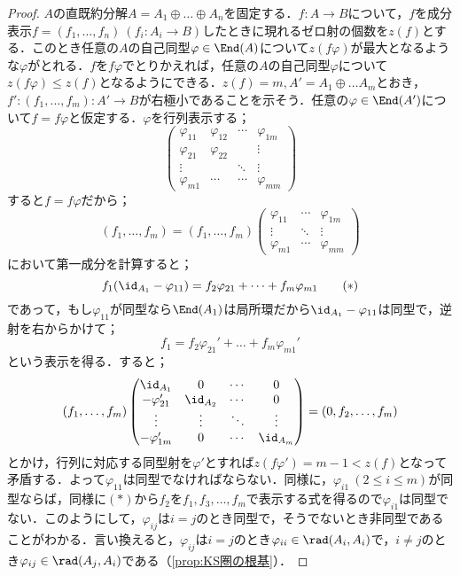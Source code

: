 \begin{proof}
	$A$の直既約分解$A=A_1\oplus\dots\oplus A_n$を固定する．$f:A\to B$について，$f$を成分表示$f=(f_1,\dots,f_n)~(f_i:A_i\to B)$したときに現れるゼロ射の個数を$z(f)$とする．このとき任意の$A$の自己同型$\varphi\in\End(A)$について$z(f\varphi)$が最大となるような$\varphi$がとれる．$f$を$f\varphi$でとりかえれば，任意の$A$の自己同型$\varphi$について$z(f\varphi)\leq z(f)$となるようにできる．$z(f)=m,A'=A_1\oplus\dots A_m$とおき，$f':(f_1,\dots,f_m):A'\to B$が右極小であることを示そう．任意の$\varphi\in\End(A')$について$f=f\varphi$と仮定する．$\varphi$を行列表示する；
	\[\begin{pmatrix}
		\varphi_{11}&\varphi_{12}&\cdots&\varphi_{1m}\\
		\varphi_{21}&\varphi_{22}&&\vdots\\
		\vdots&&\ddots&\vdots\\
		\varphi_{m1}&\cdots&\cdots&\varphi_{mm}
	\end{pmatrix}\]
	すると$f=f\varphi$だから；
	\[(f_1,\dots,f_m)=(f_1,\dots,f_m)
	\begin{pmatrix}
		\varphi_{11}&\cdots&\varphi_{1m}\\
		\vdots&\ddots&\vdots\\
		\varphi_{m1}&\cdots&\varphi_{mm}
	\end{pmatrix}\]
	において第一成分を計算すると；
	\[f_1(\id_{A_1}-\varphi_{11})=f_2\varphi_{21}+\dots+f_m\varphi_{m1}\tag{$\ast$}\]
	であって，もし$\varphi_{11}$が同型なら$\End(A_1)$は局所環だから$\id_{A_1}-\varphi_{11}$は同型で，逆射を右からかけて；
	\[f_1=f_2\varphi_{21}'+\dots+f_m\varphi_{m1}'\]
	という表示を得る．すると；
	\[(f_1,\dots,f_m)\begin{pmatrix}
		\id_{A_1}&0&\cdots&0\\
		-\varphi_{21}'&\id_{A_2}&\cdots&0\\
		\vdots&\vdots&\ddots&\vdots\\
		-\varphi_{1m}'&0&\cdots&\id_{A_m}
	\end{pmatrix}=(0,f_2,\dots,f_m)\]
	とかけ，行列に対応する同型射を$\varphi'$とすれば$z(f\varphi')=m-1<z(f)$となって矛盾する．よって$\varphi_{11}$は同型でなければならない．同様に，$\varphi_{i1}~(2\leq i\leq m)$が同型ならば，同様に$(\ast)$から$f_2$を$f_1,f_3,\dots,f_m$で表示する式を得るので$\varphi_{i1}$は同型でない．このようにして，$\varphi_{ij}$は$i=j$のとき同型で，そうでないとき非同型であることがわかる．言い換えると，$\varphi_{ij}$は$i=j$のとき$\varphi_{ii}\in\rad(A_i,A_i)$で，$i\neq j$のとき$\varphi_{ij}\in\rad(A_j,A_i)$である（\ref{prop:KS圏の根基}）．
	

\end{proof}
